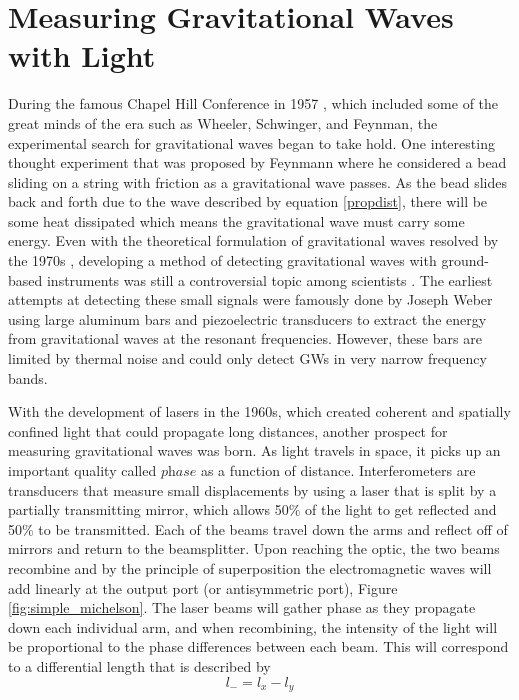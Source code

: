 	\section{Measuring Gravitational Waves with Light}\label{measuringGWs}
	During the famous Chapel Hill Conference in 1957 \cite{Chapel_Hill}, which included some of the great minds of the era such as Wheeler, Schwinger, and Feynman, the experimental search for gravitational waves began to take hold.  One interesting thought experiment that was proposed by Feynmann \cite{SmootBrief} where he considered a bead sliding on a string with friction as a gravitational wave passes.  As the bead slides back and forth due to the wave described by equation \ref{propdist}, there will be some heat dissipated which means the gravitational wave must carry some energy.  Even with the theoretical formulation of gravitational waves resolved by the 1970s \cite{PiraniPhysicalSignificance}, developing a method of detecting gravitational waves with ground-based instruments was still a controversial topic among scientists \cite{CollinsGravity}. The earliest attempts at detecting these small signals were famously done by Joseph Weber \cite{Weber} using large aluminum bars and piezoelectric transducers to extract the energy from gravitational waves at the resonant frequencies.  However, these bars are limited by thermal noise and could only detect GWs in very narrow frequency bands. 
	
	With the development of lasers in the 1960s, which created coherent and spatially confined light that could propagate long distances, another prospect for measuring gravitational waves was born.  As light travels in space, it picks up an important quality called $\textit{phase}$ as a function of distance.  Interferometers are transducers that measure small displacements by using a laser that is split by a partially transmitting mirror, which allows 50$\%$ of the light to get reflected and 50$\%$ to be transmitted.  Each of the beams travel down the arms and reflect off of mirrors and return to the beamsplitter.  Upon reaching the optic, the two beams recombine and by the principle of superposition  the electromagnetic waves will add linearly at the output port (or antisymmetric port), Figure \ref{fig:simple_michelson}.  The laser beams will gather phase as they propagate down each individual arm, and when recombining, the intensity of the light will be proportional to the phase differences between each beam.  This will correspond to a differential length that is described by
	\begin{equation}
	l_{-} = l_{x} - l_{y}
	\end{equation}
	
